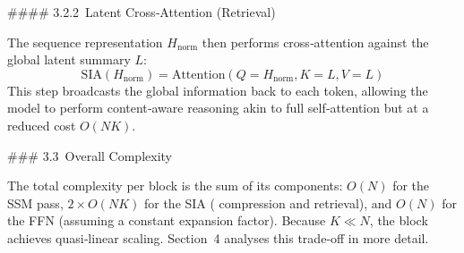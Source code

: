 \documentclass[10pt,twocolumn,letterpaper]{article}
\begin{document}
#### 3.2.2 Latent Cross‑Attention (Retrieval)

The sequence representation $H_{\text{norm}}$ then performs cross‑attention against the global latent summary $L$:
\begin{equation}
\mathrm{SIA}(H_{\text{norm}}) = \mathrm{Attention}(Q=H_{\text{norm}}, K=L, V=L)
\end{equation}
This step broadcasts the global information back to each token, allowing the model to perform content‑aware reasoning akin to full self‑attention but at a reduced cost $O(NK)$.

### 3.3 Overall Complexity

The total complexity per block is the sum of its components: $O(N)$ for the SSM pass, $2\times O(NK)$ for the SIA (
compression and retrieval), and $O(N)$ for the FFN (assuming a constant expansion factor).  Because $K\ll N$, the block achieves quasi‑linear scaling.  Section 4 analyses this trade‑off in more detail.
\end{document}
